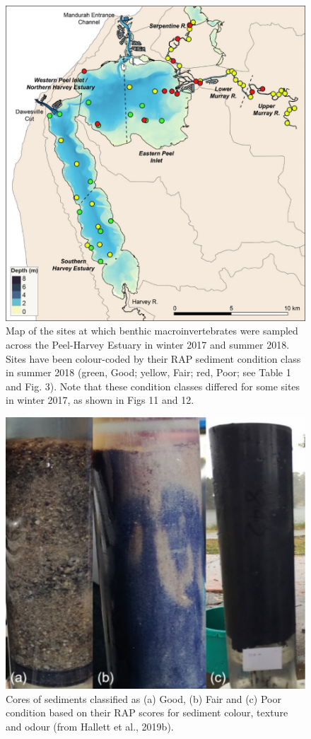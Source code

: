 \documentclass[
]{book}
\begin{document}
\begin{figure}
\includegraphics[width=1\linewidth]{images/BMI/picture4} \caption{Map of the sites at which benthic macroinvertebrates were sampled across the Peel-Harvey Estuary in winter 2017 and summer 2018. Sites have been colour-coded by their RAP sediment condition class in summer 2018 (green, Good; yellow, Fair; red, Poor; see Table 1 and Fig. 3). Note that these condition classes differed for some sites in winter 2017, as shown in Figs 11 and 12.}\label{fig:BMI-pic4}
\end{figure}

\begin{figure}
\includegraphics[width=0.5\linewidth]{images/BMI/picture5} \caption{Cores of sediments classified as (a) Good, (b) Fair and (c) Poor condition based on their RAP scores for sediment colour, texture and odour (from Hallett et al., 2019b).}\label{fig:BMI-pic5}
\end{figure}
\end{document}

